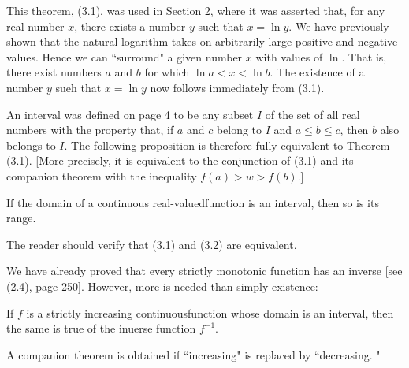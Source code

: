 This theorem, (3.1), was used in Section 2, where it was asserted that, for any real number $x$, there exists a number $y$ such that $x = \ln y$. We have previously shown that the natural logarithm takes on arbitrarily large positive and negative values. Hence we can ``surround" a given number $x$ with values of $\ln$. That is, there exist numbers $a$ and $b$ for which $\ln a < x < \ln b$. The existence of a number $y$ sueh that $x = \ln y$ now follows immediately from (3.1).

An interval was defined on page 4 to be any subset $I$ of the set of all real numbers with the property that, if $a$ and $c$ belong to $I$ and $a \leq b \leq c$, then $b$ also belongs to $I$. The following proposition is therefore fully equivalent to Theorem (3.1). [More precisely, it is equivalent to the conjunction of (3.1) and its companion theorem with the inequality $f(a) > w > f(b)$.]

\begin{theorem} %
If the domain of a continuous real-valuedfunction is an interval, then so is its range.
\end{theorem}

The reader should verify that (3.1) and (3.2) are equivalent.

We have already proved that every strictly monotonic function has an inverse [see (2.4), page 250]. However, more is needed than simply existence:

\begin{theorem} %
If $f$ is a strictly increasing continuousfunction whose domain is an interval, then the same is true of the inuerse function $f^{-1}$.
\end{theorem}

A companion theorem is obtained if ``increasing" is replaced by ``decreasing. "

